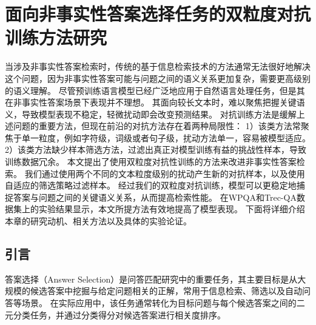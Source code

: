 \chapter{面向非事实性答案选择任务的双粒度对抗训练方法研究}

当涉及非事实性答案检索时，传统的基于信息检索技术的方法通常无法很好地解决这个问题，因为非事实性答案可能与问题之间的语义关系更加复杂，需要更高级别的语义理解。
尽管预训练语言模型已经广泛地应用于自然语言处理任务，但是其在非事实性答案场景下表现并不理想。
其面向较长文本时，难以聚焦把握关键语义，导致模型表现不稳定，轻微扰动即会改变预测结果。
对抗训练方法是缓解上述问题的重要方法，但现在前沿的对抗方法存在着两种局限性：
1）该类方法常聚焦于单一粒度，例如字符级，词级或者句子级，扰动方法单一，容易被模型适应。
2）该类方法缺少样本筛选方法，过滤出真正对模型训练有益的挑战性样本，导致训练数据冗余。
本文提出了使用双粒度对抗性训练的方法来改进非事实性答案检索。
我们通过使用两个不同的文本粒度级别的扰动产生新的对抗样本，以及使用自适应的筛选策略过滤样本。
经过我们的双粒度对抗训练，模型可以更稳定地捕捉答案与问题之间的关键语义关系，从而提高检索性能。
在WPQA和Trec-QA数据集上的实验结果显示，本文所提方法有效地提高了模型表现。
下面将详细介绍本章的研究动机、相关方法以及具体的实验论证。


\section{引言}

答案选择（Answer Selection）是问答匹配研究中的重要任务，其主要目标是从大规模的候选答案中挖掘与给定问题相关的正解，常用于信息检索、筛选以及自动问答等场景。
在实际应用中，该任务通常转化为目标问题与每个候选答案之间的二元分类任务，并通过分类得分对候选答案进行相关度排序。

